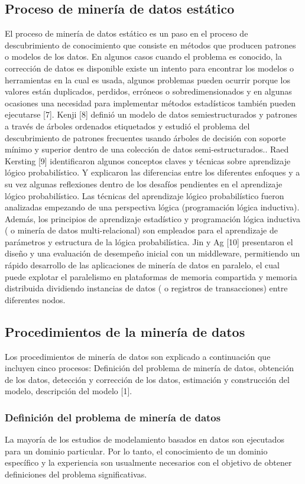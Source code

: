  \subsection{Proceso de minería de datos estático}
El proceso de minería de datos estático es un paso en el proceso de descubrimiento de conocimiento que consiste en métodos que producen patrones o modelos de los datos. En algunos casos cuando el problema es conocido, la corrección de datos es disponible  existe un intento para encontrar los modelos o herramientas en la cual es usada, algunos problemas pueden ocurrir porque los valores están duplicados, perdidos, erróneos o sobredimensionados y en algunas ocasiones una necesidad para implementar métodos estadísticos también pueden ejecutarse [7].
Kenji [8] definió un modelo de datos semiestructurados y patrones a través de árboles ordenados etiquetados y estudió el problema del descubrimiento de patrones frecuentes usando árboles de decisión con soporte mínimo y superior dentro de una colección de datos semi-estructurados.. Raed  Kersting [9] identificaron algunos conceptos claves y técnicas sobre aprendizaje lógico probabilístico. Y explicaron las diferencias entre los diferentes enfoques y a su vez algunas reflexiones dentro de los desafíos pendientes en el aprendizaje lógico probabilístico. Las técnicas del aprendizaje lógico probabilístico fueron analizadas empezando de una perspectiva lógica (programación lógica inductiva). Además, los principios de aprendizaje estadístico y programación lógica inductiva ( o minería de datos multi-relacional) son empleados para el aprendizaje de parámetros y estructura de la lógica probabilística. Jin y Ag [10] presentaron el diseño y una evaluación de desempeño inicial con un middleware, permitiendo un rápido desarrollo de las aplicaciones de minería de datos en paralelo, el cual puede explotar el paralelismo en plataformas de memoria compartida y memoria distribuida dividiendo instancias  de datos ( o registros de transacciones) entre diferentes nodos. 

 \subsection{Procedimientos de la minería de datos}
Los procedimientos de minería de datos son explicado a continuación que incluyen cinco procesos: Definición del problema de minería de datos, obtención de los datos, detección y corrección de los datos, estimación y construcción del modelo, descripción del modelo [1].
\subsubsection{Definición del problema de minería de datos}
La mayoría de los estudios de modelamiento basados en datos son ejecutados para un dominio particular. Por lo tanto, el conocimiento de un dominio específico y la experiencia son usualmente necesarios con el objetivo de obtener definiciones del problema significativas. 
